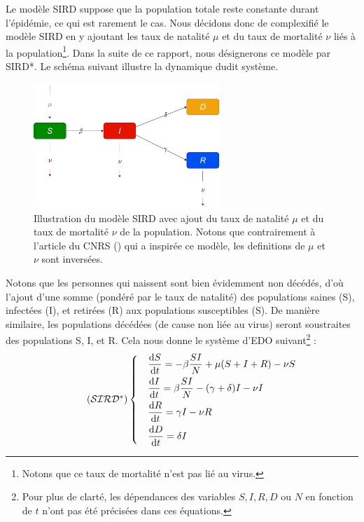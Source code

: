 \documentclass[
  french,
	10pt, %
]{fphw}
\begin{document}
Le modèle SIRD suppose que la population totale reste constante durant l'épidémie, ce qui est rarement le cas. Nous décidons donc de complexifié le modèle SIRD en y ajoutant les taux de natalité $\mu$ et du taux de mortalité $\nu$ liés à la population\footnote{Notons que ce taux de mortalité n'est pas lié au virus.}. Dans la suite de ce rapport, nous désignerons ce modèle par SIRD*. Le schéma suivant illustre la dynamique dudit système.
\begin{figure}[H]
  \centering
  \includegraphics[width=7cm]{SIRD2.png}
  \caption{Illustration du modèle SIRD avec ajout du taux de natalité $\mu$ et du taux de mortalité $\nu$ de la population. Notons que contrairement à l'article du CNRS (\cite{CNRS}) qui a inspirée ce modèle, les definitions de $\mu$ et $\nu$ sont inversées.}
  \label{fig:SIRD2}
\end{figure}
Notons que les personnes qui naissent sont bien évidemment non décédés, d'où l'ajout d'une somme (pondéré par le taux de natalité) des populations saines (S), infectées (I), et retirées (R) aux populations susceptibles (S). De manière similaire, les populations décédées (de cause non liée au virus) seront soustraites des populations S, I, et R. Cela nous donne le système d'EDO suivant\footnote{Pour plus de clarté, les dépendances des variables $S, I, R, D$ ou $N$ en fonction de $t$ n'ont pas été précisées dans ces équations.} :
\begin{align*}
  \tag{$\mathcal{SIRD^*}$}
  \begin{dcases}    
  & \frac{\mathrm{d}S}{\mathrm{d}t}= - \beta \frac{S I}{N}  + \mu (S+I+R) - \nu S \\
  & \frac{\mathrm{d}I}{\mathrm{d}t}= \beta \frac{S I}{N} - (\gamma + \delta) I - \nu I \\
  & \frac{\mathrm{d}R}{\mathrm{d}t}= \gamma I - \nu R \\
  & \frac{\mathrm{d}D}{\mathrm{d}t}= \delta I
  \end{dcases}
\end{align*}
\end{document}
